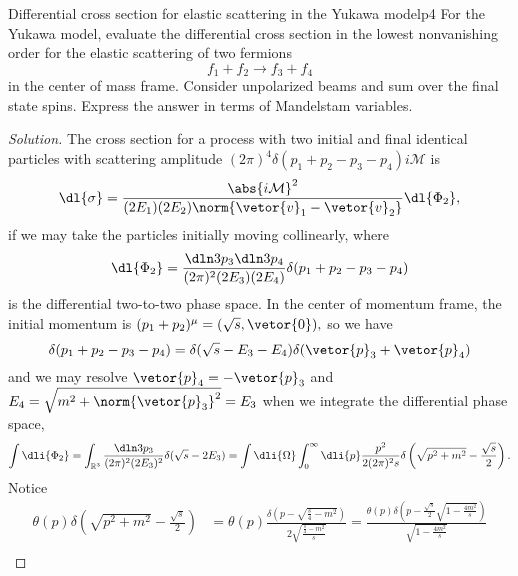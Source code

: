 \begin{problem}{Differential cross section for elastic scattering in the Yukawa model}{p4}
    For the Yukawa model, evaluate the differential cross section in the lowest nonvanishing order for the elastic scattering of two fermions
    \begin{equation*}
        f_1 + f_2 \to f_3 + f_4
    \end{equation*}
    in the center of mass frame. Consider unpolarized beams and sum over the final state spins. Express the answer in terms of Mandelstam variables.
\end{problem}
\begin{proof}[Solution]
    The cross section for a process with two initial and final identical particles with scattering amplitude \((2\pi)^4 \delta(p_1 + p_2 - p_3 - p_4) i\mathcal{M}\) is
    \begin{equation*}
        \dl{\sigma} = \frac{\abs{i \mathcal{M}}^2}{(2 E_1)(2 E_2) \norm{\vetor{v}_1 - \vetor{v}_2}} \dl{\Phi_2},
    \end{equation*}
    if we may take the particles initially moving collinearly, where
    \begin{equation*}
        \dl{\Phi_2} = \frac{\dln3{p_3}\dln3{p_4}}{(2\pi)^2 (2E_3)(2E_4)} \delta(p_1 + p_2 - p_3 - p_4)
    \end{equation*}
    is the differential two-to-two phase space. In the center of momentum frame, the initial momentum is \((p_1 + p_2)^\mu = (\sqrt{s}, \vetor{0}),\) so we have
    \begin{equation*}
        \delta(p_1 + p_2 - p_3 - p_4) = \delta(\sqrt{s} - E_3 - E_4) \delta(\vetor{p}_3 + \vetor{p}_4)
    \end{equation*}
    and we may resolve \(\vetor{p}_4 = - \vetor{p}_3\) and \(E_4 = \sqrt{m^2 + \norm{\vetor{p}_3}^2} = E_3\) when we integrate the differential phase space,
    \begin{equation*}
        \int \dli{\Phi_2} = \int_{\mathbb{R}^3} \frac{\dln3{p_3}}{(2\pi)^2 (2 E_3)^2} \delta(\sqrt{s} - 2E_3) = \int \dli{\Omega}\int_{0}^\infty \dli{p} \frac{p^2}{2(2\pi)^2 s} \delta\left(\sqrt{p^2 + m^2} - \frac{\sqrt{s}}{2}\right).
    \end{equation*}
    Notice
    \begin{align*}
        \theta(p)\delta\left(\sqrt{p^2 + m^2} - \frac{\sqrt{s}}{2}\right) &= \theta(p)\frac{\delta\left(p - \sqrt{\frac{s}{4} - m^2}\right)}{2\sqrt{\frac{\frac{s}{4} - m^2}{s}}} = \frac{\theta(p) \delta\left(p - \frac{\sqrt{s}}{2}\sqrt{1- \frac{4m^2}{s}}\right)}{\sqrt{1 - \frac{4m^2}{s}}}\\

\end{align*}
\end{proof}
